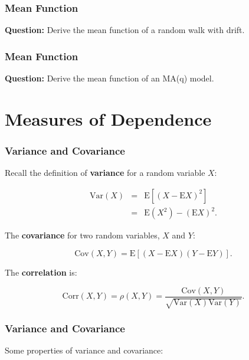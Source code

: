 \documentclass[%
xcolor=pdftex]{beamer}
\begin{document}
\begin{frame}
\frametitle{Mean Function}

\textbf{Question:} Derive the mean function of a random walk with drift.

\vspace{50mm}

\end{frame}

\begin{frame}
\frametitle{Mean Function}

\textbf{Question:} Derive the mean function of an MA(q) model.

\vspace{50mm}

\end{frame}

\section{Measures of Dependence}
\frame{\tableofcontents[currentsection]}

\begin{frame}
\frametitle{Variance and Covariance}

Recall the definition of \textbf{variance} for a random variable $X$:

\begin{eqnarray}
\mbox{Var}(X) &=& \mbox{E}[(X-\mbox{E}X)^2] \nonumber \\
              &=& \mbox{E}(X^2) - \left(\mbox{E}X\right)^2.
\end{eqnarray}

The \textbf{covariance} for two random variables, $X$ and $Y$:

\begin{equation}
\mbox{Cov}(X,Y)=\mbox{E}[(X-\mbox{E}X)(Y-\mbox{E}Y)].
\end{equation}

The \textbf{correlation} is:

\begin{equation}
\mbox{Corr}(X,Y) = \rho(X,Y) = \frac{\mbox{Cov}(X,Y)}{\sqrt{\mbox{Var}(X)\mbox{Var}(Y)}}.
\end{equation}

\end{frame}

\begin{frame}
\frametitle{Variance and Covariance}
Some properties of variance and covariance:

\vspace{50mm}

\end{frame}
\end{document}
